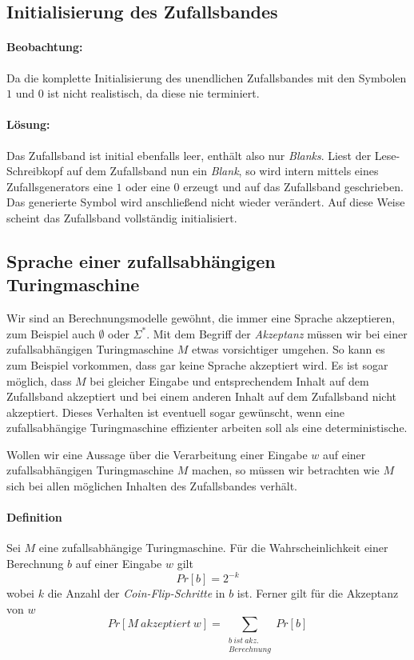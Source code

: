 \subsection{Initialisierung des Zufallsbandes}
\paragraph{Beobachtung:}
Da die komplette Initialisierung des unendlichen Zufallsbandes mit den Symbolen $1$ und $0$ ist nicht realistisch, da diese nie terminiert.

\paragraph{Lösung:}
Das Zufallsband ist initial ebenfalls leer, enthält also nur \emph{Blanks}. 
Liest der Lese-Schreibkopf auf dem Zufallsband nun ein \emph{Blank}, so wird intern mittels eines Zufallsgenerators eine $1$ oder eine $0$ erzeugt und auf das Zufallsband geschrieben.
Das generierte Symbol wird anschließend nicht wieder verändert.
Auf diese Weise scheint das Zufallsband vollständig initialisiert.


\subsection{Sprache einer zufallsabhängigen Turingmaschine}
Wir sind an Berechnungsmodelle gewöhnt, die immer eine Sprache akzeptieren, zum Beispiel auch $\emptyset$ oder $\Sigma^*$.
Mit dem Begriff der \emph{Akzeptanz} müssen wir bei einer zufallsabhängigen Turingmaschine $M$ etwas vorsichtiger umgehen.
So kann es zum Beispiel vorkommen, dass gar keine Sprache akzeptiert wird.
Es ist sogar möglich, dass $M$ bei gleicher Eingabe und entsprechendem Inhalt auf dem Zufallsband akzeptiert und bei einem anderen Inhalt auf dem Zufallsband nicht akzeptiert.
Dieses Verhalten ist eventuell sogar gewünscht, wenn eine zufallsabhängige Turingmaschine effizienter arbeiten soll als eine deterministische.

Wollen wir eine Aussage über die Verarbeitung einer Eingabe $w$ auf einer zufallsabhängigen Turingmaschine $M$ machen, so müssen wir betrachten wie $M$ sich bei allen möglichen Inhalten des Zufallsbandes verhält.

\paragraph{Definition}
Sei $M$ eine zufallsabhängige Turingmaschine.
Für die Wahrscheinlichkeit einer Berechnung $b$ auf einer Eingabe $w$ gilt
\begin{equation*}
	Pr[b] = 2^{-k}
\end{equation*}
wobei $k$ die Anzahl der \emph{Coin-Flip-Schritte} in $b$ ist. 
Ferner gilt für die Akzeptanz von $w$
\begin{equation*}
	Pr[M\ akzeptiert\ w] = \sum_{\substack{b\ ist\ akz.\\ Berechnung}} Pr[b] 
\end{equation*}


